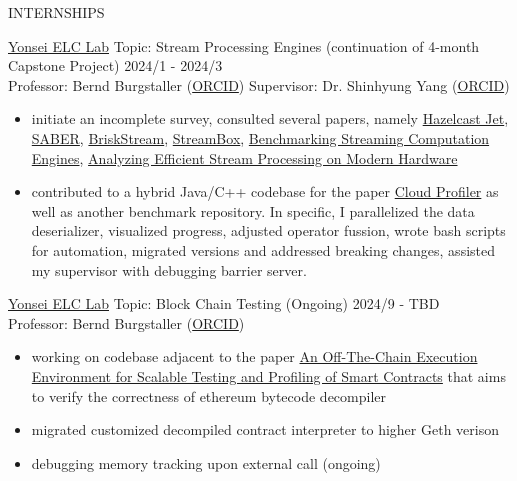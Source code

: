 \documentclass{resume} %
\begin{document}
\begin{rSection}{INTERNSHIPS} 

\href{https://elc.yonsei.ac.kr/}{Yonsei ELC Lab} \quad Topic: Stream Processing Engines
(continuation of 4-month Capstone Project)
 \hfill 2024/1 - 2024/3 \\ 
Professor: Bernd Burgstaller (\href{https://orcid.org/0000-0002-0374-8853}{ORCID}) 
\qquad Supervisor: Dr. Shinhyung Yang (\href{https://orcid.org/0000-0002-8997-9942}{ORCID})
\begin{itemize}
\item initiate an incomplete survey, consulted several papers, namely 
\href{https://arxiv.org/abs/2103.10169}{Hazelcast Jet},
\href{https://raulcastrofernandez.com/papers/sigmod16-saber.pdf}{SABER},
\href{https://arxiv.org/abs/1904.03604}{BriskStream},
\href{https://www.usenix.org/system/files/conference/atc17/atc17-miao.pdf}{StreamBox},
\href{https://ieeexplore.ieee.org/document/7530084}{Benchmarking Streaming Computation Engines},
\href{https://dl.acm.org/doi/10.14778/3303753.3303758}{Analyzing Efficient Stream Processing on Modern Hardware}
\item contributed to a hybrid Java/C++ codebase for the paper
\href{https://arxiv.org/abs/2205.09325}{Cloud Profiler} as well as another
benchmark repository. In specific, I parallelized the data deserializer,
visualized progress, adjusted operator fussion, wrote bash scripts for
automation, migrated versions and addressed breaking changes, assisted my
supervisor with debugging barrier server.
\end{itemize}

\href{https://elc.yonsei.ac.kr/}{Yonsei ELC Lab} \quad Topic: Block Chain Testing (Ongoing) \hfill 2024/9 - TBD \\ 
Professor: Bernd Burgstaller (\href{https://orcid.org/0000-0002-0374-8853}{ORCID}) 
\begin{itemize}
\item working on codebase adjacent to the paper
\href{https://www.usenix.org/conference/atc21/presentation/kim-yeonsoo}{An
Off-The-Chain Execution Environment for Scalable Testing and Profiling of Smart
Contracts} that aims to verify the correctness of ethereum bytecode decompiler
\item migrated customized decompiled contract interpreter to higher Geth verison
\item debugging memory tracking upon external call (ongoing)
\end{itemize}
\end{rSection} 

\end{document}
